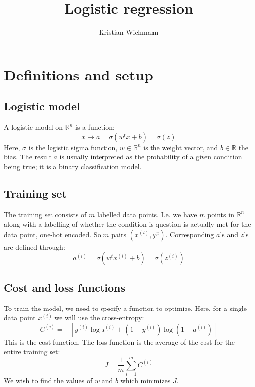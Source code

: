 \documentclass[12pt, a4paper]{article}
\title{Logistic regression}
\author{Kristian Wichmann}
\numberwithin{equation}{section}
\begin{document}
\maketitle

\section{Definitions and setup}

\subsection{Logistic model}
A logistic model on $\mathbb{R}^n$ is a function:
\begin{equation}
x\mapsto a=\sigma(w^t x+b)=\sigma(z)
\end{equation}
Here, $\sigma$ is the logistic sigma function, $w\in\mathbb{R}^n$ is the weight vector, and $b\in\mathbb{R}$ the bias. The result $a$ is usually interpreted as the probability of a given condition being true; it is a binary classification model.

\subsection{Training set}
The training set consists of $m$ labelled data points. I.e. we have $m$ points in $\mathbb{R}^n$ along with a labelling of whether the condition is question is actually met for the data point, one-hot encoded. So $m$ pairs $(x^{(i)},y^{(i})$. Corresponding $a$'s and $z$'s are defined through:
\begin{equation}
a^{(i)}=\sigma(w^t x^{(i)}+b)=\sigma(z^{(i)})
\end{equation}

\subsection{Cost and loss functions}
To train the model, we need to specify a function to optimize. Here, for a single data point $x^{(i)}$ we will use the cross-entropy:
\begin{equation}
C^{(i)}=-\left[y^{(i)}\log a^{(i)}+(1-y^{(i)})\log(1-a^{(i)})\right]
\end{equation}
This is the cost function. The loss function is the average of the cost for the entire training set:
\begin{equation}
J=\frac{1}{m}\sum_{i=1}^m C^{(i)}
\end{equation}
We wish to find the values of $w$ and $b$ which minimizes $J$.
\end{document}
